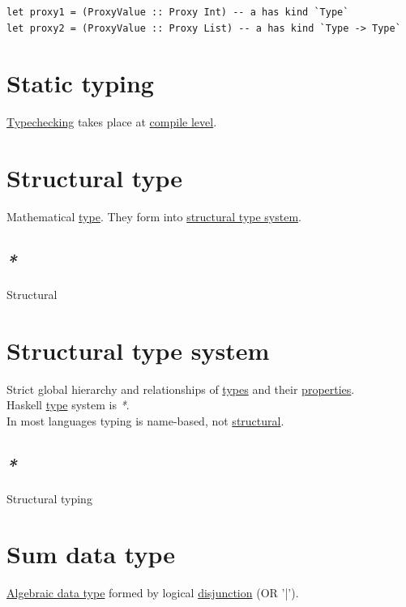 \documentclass[a4paper,14pt,oneside]{book}
\begin{document}
{\begin{verbatim}
let proxy1 = (ProxyValue :: Proxy Int) -- a has kind `Type`
let proxy2 = (ProxyValue :: Proxy List) -- a has kind `Type -> Type`
\end{verbatim}

\section{\label{org21e1fb7}Static typing}
\label{sec:orgf654971}
\hyperref[orgffb2d89]{Typechecking} takes place at \hyperref[orge689fcd]{compile level}.\\

\section{\label{org5607c0a}Structural type}
\label{sec:org52c0b13}
Mathematical \hyperref[orga9ca243]{type}. They form into \hyperref[org9d95a71]{structural type system}.\\

\subsection{\emph{*}}
\label{sec:org54f78ca}

\label{orgf8c4120}Structural\\

\section{\label{org9d95a71}Structural type system}
\label{sec:org023804c}
Strict global hierarchy and relationships of \hyperref[org51532d9]{types} and their \hyperref[org5fc06ca]{properties}.\\
Haskell \hyperref[orga9ca243]{type} system is \emph{*}.\\
In most languages typing is name-based, not \hyperref[orgf8c4120]{structural}.\\

\subsection{\emph{*}}
\label{sec:org430e9b0}

\label{org6da1505}Structural typing\\

\section{\label{org50a9adf}Sum data type}
\label{sec:org3fb731b}
\hyperref[org1ceda42]{Algebraic data type} formed by logical \hyperref[org66ac745]{disjunction} (OR '|').\\

}
\end{document}
